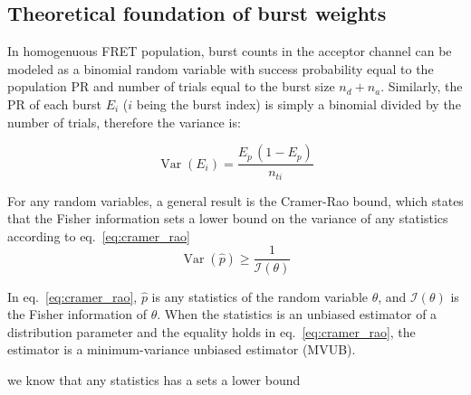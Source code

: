 \subsection{Theoretical foundation of burst weights}
\label{sec:burstweights_theory}
In homogenuous FRET population, burst counts in the acceptor channel can be
modeled as a binomial random variable with success probability equal to the
population PR and number of trials equal to the burst size $n_d + n_a$.
Similarly, the PR of each burst $E_i$ ($i$ being the burst index) is simply a binomial divided by the 
number of trials, therefore the variance is:

\begin{equation}
\label{eq:E_var}
\operatorname{Var} (E_i) = \frac{E_p\,(1 - E_p)}{n_{ti}}
\end{equation}

For any random variables, a general result is the
Cramer-Rao bound, which states that the Fisher information sets a lower bound on the
variance of any statistics according to eq.~\ref{eq:cramer_rao}
\begin{equation}
\label{eq:cramer_rao}
\operatorname{Var}\left(\hat{p}\right) \ge \frac{1}{\mathcal{I}(\theta)}
\end{equation}

In eq.~\ref{eq:cramer_rao}, $\hat{p}$ is any statistics of the random variable $\theta$,
and $\mathcal{I}(\theta)$ is the Fisher information of $\theta$. When the statistics is
an unbiased estimator of a distribution parameter and the equality holds in eq.~\ref{eq:cramer_rao},
the estimator is a minimum-variance unbiased estimator (MVUB).

we know that any statistics
has a 
sets a lower bound
